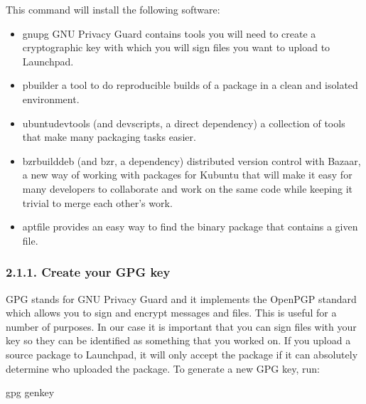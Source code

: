 \documentclass[letterpaper,10pt,english]{sphinxmanual}
\begin{document}
\sphinxAtStartPar
This command will install the following software:
\begin{itemize}
\item {} 
\sphinxAtStartPar
gnupg \textendash{} GNU Privacy Guard contains tools you will need to create a cryptographic key with which you will sign files you want to upload to Launchpad.

\item {} 
\sphinxAtStartPar
pbuilder \textendash{} a tool to do reproducible builds of a package in a clean and isolated environment.

\item {} 
\sphinxAtStartPar
ubuntu\sphinxhyphen{}dev\sphinxhyphen{}tools (and devscripts, a direct dependency) \textendash{} a collection of tools that make many packaging tasks easier.

\item {} 
\sphinxAtStartPar
bzr\sphinxhyphen{}builddeb (and bzr, a dependency) \textendash{} distributed version control with Bazaar, a new way of working with packages for Kubuntu that will make it easy for many developers to collaborate and work on the same code while keeping it trivial to merge each other’s work.

\item {} 
\sphinxAtStartPar
apt\sphinxhyphen{}file provides an easy way to find the binary package that contains a given file.

\end{itemize}


\subsubsection{2.1.1. Create your GPG key}
\label{\detokenize{docs/packaging_guide/getting_started:create-your-gpg-key}}
\sphinxAtStartPar
GPG stands for GNU Privacy Guard and it implements the OpenPGP standard which allows you to sign and encrypt messages and files. This is useful for a number of purposes. In our case it is important that you can sign files with your key so they can be identified as something that you worked on. If you upload a source package to Launchpad, it will only accept the package if it can absolutely determine who uploaded the package.
To generate a new GPG key, run:

\begin{sphinxVerbatim}[commandchars=\\\{\}]
\PYGZdl{} gpg \PYGZhy{}\PYGZhy{}gen\PYGZhy{}key
\end{sphinxVerbatim}
\end{document}
